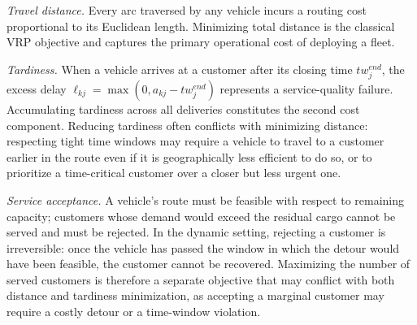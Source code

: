 \documentclass[conference]{IEEEtran}
\begin{document}
\textit{Travel distance.}
Every arc traversed by any vehicle incurs a routing cost proportional to its Euclidean length.
Minimizing total distance is the classical VRP objective and captures the primary operational cost of deploying a fleet.

\textit{Tardiness.}
When a vehicle arrives at a customer after its closing time $tw^{end}_j$, the excess delay $\ell_{kj} = \max(0, a_{kj} - tw^{end}_j)$ represents a service-quality failure.
Accumulating tardiness across all deliveries constitutes the second cost component.
Reducing tardiness often conflicts with minimizing distance: respecting tight time windows may require a vehicle to travel to a customer earlier in the route even if it is geographically less efficient to do so, or to prioritize a time-critical customer over a closer but less urgent one.

\textit{Service acceptance.}
A vehicle's route must be feasible with respect to remaining capacity; customers whose demand would exceed the residual cargo cannot be served and must be rejected.
In the dynamic setting, rejecting a customer is irreversible: once the vehicle has passed the window in which the detour would have been feasible, the customer cannot be recovered.
Maximizing the number of served customers is therefore a separate objective that may conflict with both distance and tardiness minimization, as accepting a marginal customer may require a costly detour or a time-window violation.
\end{document}
